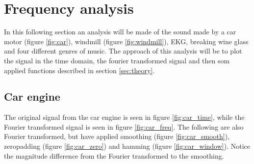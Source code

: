 \section{Frequency analysis}
\label{sec:analysis}

In this following section an analysis will be made of the sound made by a car motor (figure \ref{fig:car}), windmill (figure \ref{fig:windmill}), EKG, breaking wine glass and four different genres of music. 
The approach of this analysis will be to plot the signal in the time domain, the fourier transformed signal and then som applied functions described in section \ref{sec:theory}.


\subsection{Car engine}

The original signal from the car engine is seen in figure \ref{fig:car_time}, while the Fourier transformed signal is seen in figure \ref{fig:car_freq}. The following are also Fourier transformed, but have applied smoothing (figure \ref{fig:car_smooth}), zeropadding (figure \ref{fig:car_zero}) and hamming (figure \ref{fig:car_window}). Notice the magnitude difference from the Fourier transformed to the smoothing.

